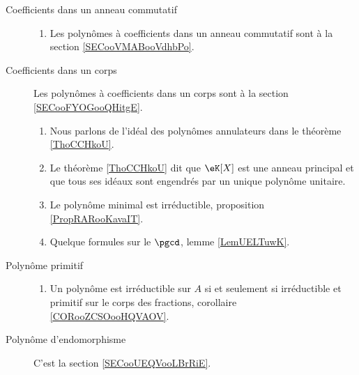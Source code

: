 
\begin{description}
    \item[Coefficients dans un anneau commutatif]

        \begin{enumerate}
            \item
Les polynômes à coefficients dans un anneau commutatif  sont à la section \ref{SECooVMABooVdhbPo}.
        \end{enumerate}
        

    \item[Coefficients dans un corps]
Les polynômes à coefficients dans un corps sont à la section \ref{SECooFYOGooQHitgE}.
        \begin{enumerate}
                
\item
Nous parlons de l'idéal des polynômes annulateurs dans le théorème \ref{ThoCCHkoU}.
            \item
                Le théorème \ref{ThoCCHkoU} dit que \( \eK[X]\) est une anneau principal et que tous ses idéaux sont engendrés par un unique polynôme unitaire.
            \item
                Le polynôme minimal est irréductible, proposition \ref{PropRARooKavaIT}.
            \item
                Quelque formules sur le \( \pgcd\), lemme \ref{LemUELTuwK}.
        \end{enumerate}
    \item[Polynôme primitif]
    
        \begin{enumerate}
            \item
                Un polynôme est irréductible sur \( A\) si et seulement si irréductible et primitif sur le corps des fractions, corollaire \ref{CORooZCSOooHQVAOV}.
        \end{enumerate}

    \item[Polynôme d'endomorphisme]
        C'est la section \ref{SECooUEQVooLBrRiE}.

\end{description}



